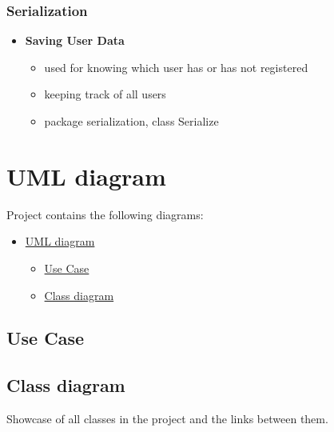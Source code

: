 \documentclass[
]{report}
\providecommand{\tightlist}{%
  \setlength{\itemsep}{0pt}\setlength{\parskip}{0pt}}
\begin{document}
\hypertarget{serialization}{%
\subsection{Serialization}\label{serialization}}

\begin{itemize}
\tightlist
\item
  \textbf{Saving User Data}

  \begin{itemize}
  \tightlist
  \item
    used for knowing which user has or has not registered
  \item
    keeping track of all users
  \item
    package serialization, class Serialize
  \end{itemize}
\end{itemize}

\hypertarget{uml-diagram}{%
\chapter{UML diagram}\label{uml-diagram}}

Project contains the following diagrams:

\begin{itemize}
\tightlist
\item
  \protect\hyperlink{uml-diagram}{UML diagram}

  \begin{itemize}
  \tightlist
  \item
    \protect\hyperlink{use-case}{Use Case}
  \item
    \protect\hyperlink{class-diagram}{Class diagram}
  \end{itemize}
\end{itemize}

\hypertarget{use-case}{%
\section{Use Case}\label{use-case}}

\hypertarget{class-diagram}{%
\section{Class diagram}\label{class-diagram}}

Showcase of all classes in the project and the links between them.
\end{document}
